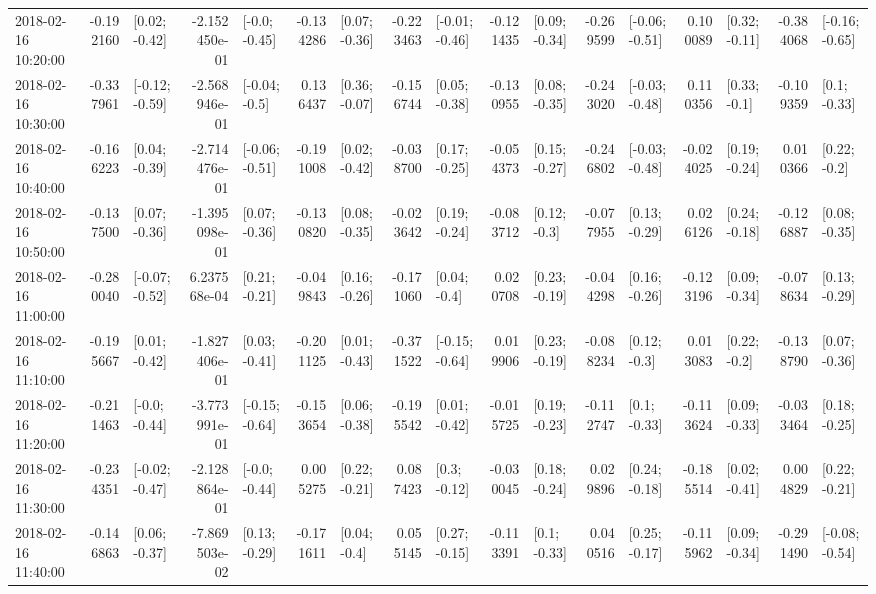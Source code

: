 \begin{tabular}{lrlrlrlrlrlrlrlrl}
2018-02-16 10:20:00 & -0.192160 &   [0.02; -0.42] & -2.152450e-01 &   [-0.0; -0.45] & -0.134286 &   [0.07; -0.36] & -0.223463 &  [-0.01; -0.46] & -0.121435 &   [0.09; -0.34] & -0.269599 &  [-0.06; -0.51] &  0.100089 &   [0.32; -0.11] & -0.384068 &  [-0.16; -0.65] \\
2018-02-16 10:30:00 & -0.337961 &  [-0.12; -0.59] & -2.568946e-01 &   [-0.04; -0.5] &  0.136437 &   [0.36; -0.07] & -0.156744 &   [0.05; -0.38] & -0.130955 &   [0.08; -0.35] & -0.243020 &  [-0.03; -0.48] &  0.110356 &    [0.33; -0.1] & -0.109359 &    [0.1; -0.33] \\
2018-02-16 10:40:00 & -0.166223 &   [0.04; -0.39] & -2.714476e-01 &  [-0.06; -0.51] & -0.191008 &   [0.02; -0.42] & -0.038700 &   [0.17; -0.25] & -0.054373 &   [0.15; -0.27] & -0.246802 &  [-0.03; -0.48] & -0.024025 &   [0.19; -0.24] &  0.010366 &    [0.22; -0.2] \\
2018-02-16 10:50:00 & -0.137500 &   [0.07; -0.36] & -1.395098e-01 &   [0.07; -0.36] & -0.130820 &   [0.08; -0.35] & -0.023642 &   [0.19; -0.24] & -0.083712 &    [0.12; -0.3] & -0.077955 &   [0.13; -0.29] &  0.026126 &   [0.24; -0.18] & -0.126887 &   [0.08; -0.35] \\
2018-02-16 11:00:00 & -0.280040 &  [-0.07; -0.52] &  6.237568e-04 &   [0.21; -0.21] & -0.049843 &   [0.16; -0.26] & -0.171060 &    [0.04; -0.4] &  0.020708 &   [0.23; -0.19] & -0.044298 &   [0.16; -0.26] & -0.123196 &   [0.09; -0.34] & -0.078634 &   [0.13; -0.29] \\
2018-02-16 11:10:00 & -0.195667 &   [0.01; -0.42] & -1.827406e-01 &   [0.03; -0.41] & -0.201125 &   [0.01; -0.43] & -0.371522 &  [-0.15; -0.64] &  0.019906 &   [0.23; -0.19] & -0.088234 &    [0.12; -0.3] &  0.013083 &    [0.22; -0.2] & -0.138790 &   [0.07; -0.36] \\
2018-02-16 11:20:00 & -0.211463 &   [-0.0; -0.44] & -3.773991e-01 &  [-0.15; -0.64] & -0.153654 &   [0.06; -0.38] & -0.195542 &   [0.01; -0.42] & -0.015725 &   [0.19; -0.23] & -0.112747 &    [0.1; -0.33] & -0.113624 &   [0.09; -0.33] & -0.033464 &   [0.18; -0.25] \\
2018-02-16 11:30:00 & -0.234351 &  [-0.02; -0.47] & -2.128864e-01 &   [-0.0; -0.44] &  0.005275 &   [0.22; -0.21] &  0.087423 &    [0.3; -0.12] & -0.030045 &   [0.18; -0.24] &  0.029896 &   [0.24; -0.18] & -0.185514 &   [0.02; -0.41] &  0.004829 &   [0.22; -0.21] \\
2018-02-16 11:40:00 & -0.146863 &   [0.06; -0.37] & -7.869503e-02 &   [0.13; -0.29] & -0.171611 &    [0.04; -0.4] &  0.055145 &   [0.27; -0.15] & -0.113391 &    [0.1; -0.33] &  0.040516 &   [0.25; -0.17] & -0.115962 &   [0.09; -0.34] & -0.291490 &  [-0.08; -0.54] \\

\end{tabular}
